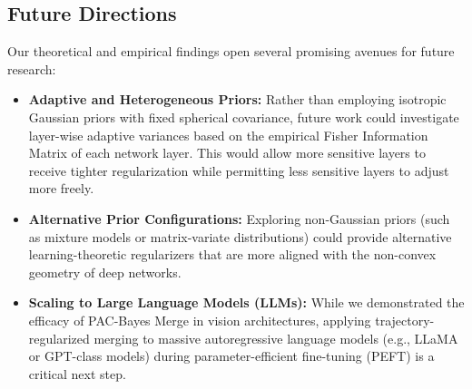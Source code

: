 \subsection{Future Directions}
Our theoretical and empirical findings open several promising avenues for future research:
\begin{itemize}
    \item \textbf{Adaptive and Heterogeneous Priors:} Rather than employing isotropic Gaussian priors with fixed spherical covariance, future work could investigate layer-wise adaptive variances based on the empirical Fisher Information Matrix of each network layer. This would allow more sensitive layers to receive tighter regularization while permitting less sensitive layers to adjust more freely.
    \item \textbf{Alternative Prior Configurations:} Exploring non-Gaussian priors (such as mixture models or matrix-variate distributions) could provide alternative learning-theoretic regularizers that are more aligned with the non-convex geometry of deep networks.
    \item \textbf{Scaling to Large Language Models (LLMs):} While we demonstrated the efficacy of PAC-Bayes Merge in vision architectures, applying trajectory-regularized merging to massive autoregressive language models (e.g., LLaMA or GPT-class models) during parameter-efficient fine-tuning (PEFT) is a critical next step.
\end{itemize}
